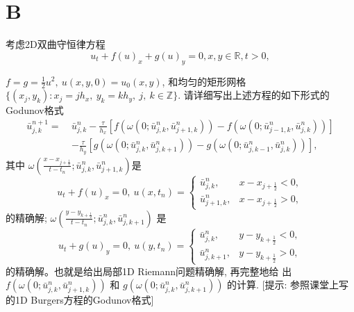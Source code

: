 \documentclass[12pt]{article}
\begin{document}
\section{B}

考虑2D双曲守恒律方程
\begin{equation}
	u_{t}+f(u)_{x}+g(u)_{y}=0, x, y \in \mathbb{R}, t>0,
\end{equation}

$f=g=\frac{1}{2} u^{2},\ u(x, y, 0)=u_{0}(x, y)$, 和均匀的矩形网格$\{\left(x_{j}, y_{k}\right):x_{j}=j h_{x},\ y_{k}=k h_{y},\ j,\ k \in \mathbb{Z}\}.$ 请详细写出上述方程的如下形式的Godunov格式
\begin{equation}
	\begin{aligned}
		\bar{u}_{j, k}^{n+1} =\  & \bar{u}_{j, k}^{n}-\frac{\tau}{h_{x}}\left[f\left(\omega\left(0 ; \bar{u}_{j, k}^{n}, \bar{u}_{j+1, k}^{n}\right)\right)-f\left(\omega\left(0 ; \bar{u}_{j-1, k}^{n}, \bar{u}_{j, k}^{n}\right)\right)\right] \\
		                         & -\frac{\tau}{h_{y}}\left[g\left(\omega\left(0 ; \bar{u}_{j, k}^{n} ,\bar{u}_{j, k+1}^{n}\right)\right)-g\left(\omega\left(0 ; \bar{u}_{j, k-1}^{n}, \bar{u}_{j, k}^{n}\right)\right)\right],
	\end{aligned}
\end{equation}
其中 $\omega \left(\frac{x-x_{j+\frac{1}{2}}}{t-t_n};\bar{u}_{j, k}^{n}, \bar{u}_{j+1, k}^{n}\right)$是
\begin{equation}
	u_{t}+f(u)_{x}=0,\ u\left(x, t_{n}\right)=\left\{\begin{array}{ll}
		\bar{u}_{j, k}^{n},   & x-x_{j+\frac{1}{2}}<0, \\
		\bar{u}_{j+1, k}^{n}, & x-x_{j+\frac{1}{2}}>0,
	\end{array}\right.
\end{equation}
的精确解; $\omega\left(\frac{y-y_{k+\frac{1}{2}}}{t-t_{n}} ; \bar{u}_{j, k}^{n}, \bar{u}_{j, k+1}^{n}\right)$ 是
\begin{equation}
	u_{t}+g(u)_{y}=0,\ u\left(y, t_{n}\right)=\left\{\begin{array}{ll}
		\bar{u}_{j, k}^{n},   & y-y_{k+\frac{1}{2}}<0, \\
		\bar{u}_{j, k+1}^{n}, & y-y_{k+\frac{1}{2}}>0,
	\end{array}\right.
\end{equation}
的精确解。也就是给出局部1D Riemann问题精确解, 再完整地给
出 $f(\omega(0 ; \bar{u}_{j, k}^{n}, \bar{u}_{j+1, k}^{n}))$ 和 $g(\omega(0 ; \bar{u}_{j, k}^{n}, \bar{u}_{j, k+1}^{n}))$ 的计算. [提示: 参照课堂上写的1D Burgers方程的Godunov格式]
\end{document}
